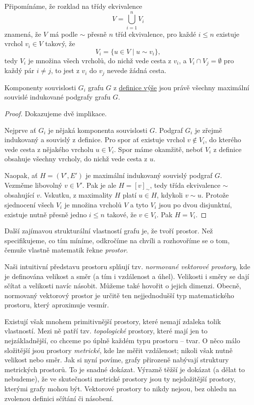 \begin{remark}
 Připomínáme, že rozklad na třídy ekvivalence
 \[
  V = \bigcup_{i = 1}^{n} V_i
 \]
 znamená, že $V$ má podle $ \sim $ přesně $n$ tříd ekvivalence, pro každé $i
 \leq n$ existuje vrchol $v_i \in V$ takový, že
 \[
  V_i = \{u \in V \mid u \sim v_i\},
 \]
 tedy $V_i$ je množina všech vrcholů, do nichž vede cesta z $v_i$, a $V_i \cap
 V_j = \emptyset$ pro každý pár $i \neq j$, to jest z $v_i$ do $v_j$ nevede
 žádná cesta.
\end{remark}

\begin{observation}
 Komponenty souvislosti $G_i$ grafu $G$ z
 \hyperref[def:komponenta-souvislosti]{definice výše} jsou právě všechny
 maximální souvislé indukované podgrafy grafu $G$.
\end{observation}
\begin{proof}
 Dokazujeme dvě implikace.

 Nejprve ať $G_i$ je nějaká komponenta souvislosti $G$. Podgraf $G_i$ je zřejmě
 indukovaný a souvislý z definice. Pro spor ať existuje vrchol $v \notin V_i$,
 do kterého vede cesta z nějakého vrcholu $u \in V_i$. Spor máme okamžitě, neboť
 $V_i$ z definice obsahuje všechny vrcholy, do nichž vede cesta z $u$. 

 Naopak, ať $H = (V',E')$ je maximální indukovaný souvislý podgraf $G$. Vezměme
 libovolný $v \in V'$. Pak je ale $H = [v]_{ \sim }$, tedy třída ekvivalence $
 \sim $ obsahující $v$. Vskutku, z maximality $H$ platí $u \in H$, kdykoli $v
 \sim u$. Protože sjednocení všech $V_i$ je množina vrcholů $V$ a tyto $V_i$
 jsou po dvou disjunktní, existuje nutně přesně jedno $i \leq n$ takové, že $v
 \in V_i$. Pak $H = V_i$.
\end{proof}

Další zajímavou strukturální vlastností grafu je, že tvoří prostor. Než
specifikujeme, co tím míníme, odkročíme na chvíli a rozhovoříme se o tom, čemuže
vlastně matematik řekne \emph{prostor}.

Naši intuitivní představu prostoru splňují tzv. \emph{normované vektorové
prostory}, kde je definována velikost a směr (a tím i vzdálenost a úhel).
Velikosti i směry se dají sčítat a velikosti navíc násobit. Můžeme také hovořit
o jejich dimenzi. Obecně, normovaný vektorový prostor je určitě ten
nejjednodušší typ matematického prostoru, který aproximuje vesmír.

Existují však mnohem primitivnější prostory, které nemají zdaleka tolik
 vlastností. Mezi ně patří tzv. \emph{topologické} prostory,
které mají jen to nejzákladnější, co chceme po úplně každém typu prostoru --
tvar. O něco málo složitější jsou prostory \emph{metrické}, kde lze měřit
vzdálenost; nikoli však nutně velikost nebo směr. Jak si nyní povíme, grafy
přirozeně nabývají struktury metrických prostorů. To je snadné dokázat. Výrazně
těžší je dokázat (a dělat to nebudeme), že ve skutečnosti metrické prostory jsou
ty nejsložitější prostory, kterými grafy mohou být. Vektorové prostory to nikdy
nejsou, bez ohledu na zvolenou definici sčítání či násobení.

